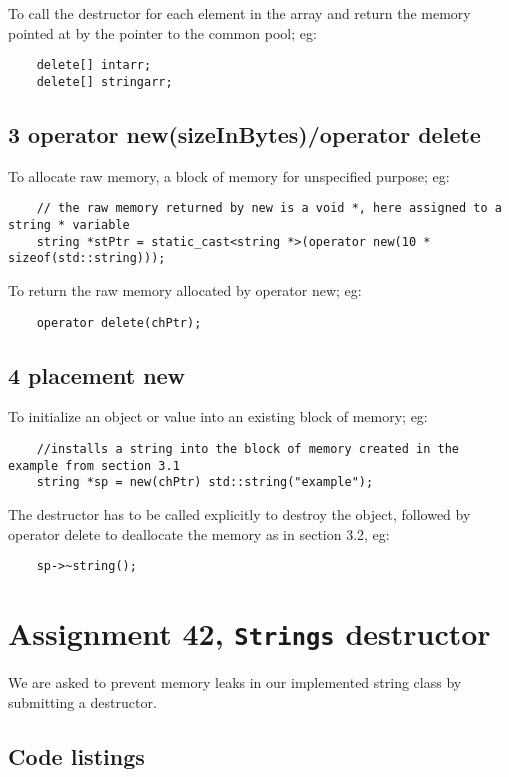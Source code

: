 \documentclass[11pt]{article}
\begin{document}
To call the destructor for each element in the array and return the memory pointed at by the pointer to the common pool; eg:
\begin{lstlisting}
	delete[] intarr;
	delete[] stringarr;
\end{lstlisting}

\subsection*{3 operator new(sizeInBytes)/operator delete}
To allocate raw memory, a block of memory for unspecified purpose; eg:
\begin{lstlisting}
	// the raw memory returned by new is a void *, here assigned to a string * variable
	string *stPtr = static_cast<string *>(operator new(10 * sizeof(std::string)));
\end{lstlisting}

To return the raw memory allocated by operator new; eg:
\begin{lstlisting}
	operator delete(chPtr);
\end{lstlisting}

\subsection*{4 placement new}
To initialize an object or value into an existing block of memory; eg:
\begin{lstlisting}
	//installs a string into the block of memory created in the example from section 3.1
	string *sp = new(chPtr) std::string("example");
\end{lstlisting}

The destructor has to be called explicitly to destroy the object, followed by operator delete to deallocate the memory as in section 3.2, eg:
\begin{lstlisting}	
	sp->~string();
\end{lstlisting}

\section*{Assignment 42, \texttt{Strings} destructor}
We are asked to prevent memory leaks in our implemented string class by submitting a destructor.

\subsection*{Code listings}
\end{document}
